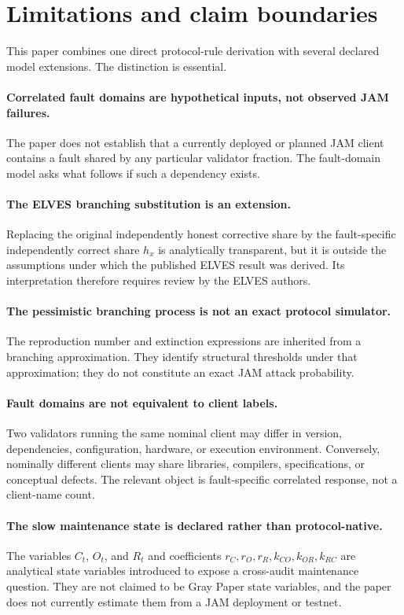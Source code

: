 \section{Limitations and claim boundaries}

This paper combines one direct protocol-rule derivation with several declared model extensions. The distinction is essential.

\paragraph{Correlated fault domains are hypothetical inputs, not observed JAM failures.}
The paper does not establish that a currently deployed or planned JAM client contains a fault shared by any particular validator fraction. The fault-domain model asks what follows if such a dependency exists.

\paragraph{The ELVES branching substitution is an extension.}
Replacing the original independently honest corrective share by the fault-specific independently correct share $h_x$ is analytically transparent, but it is outside the assumptions under which the published ELVES result was derived. Its interpretation therefore requires review by the ELVES authors.

\paragraph{The pessimistic branching process is not an exact protocol simulator.}
The reproduction number and extinction expressions are inherited from a branching approximation. They identify structural thresholds under that approximation; they do not constitute an exact JAM attack probability.

\paragraph{Fault domains are not equivalent to client labels.}
Two validators running the same nominal client may differ in version, dependencies, configuration, hardware, or execution environment. Conversely, nominally different clients may share libraries, compilers, specifications, or conceptual defects. The relevant object is fault-specific correlated response, not a client-name count.

\paragraph{The slow maintenance state is declared rather than protocol-native.}
The variables $C_t$, $O_t$, and $R_t$ and coefficients $r_C,r_O,r_R,k_{CO},k_{OR},k_{RC}$ are analytical state variables introduced to expose a cross-audit maintenance question. They are not claimed to be Gray Paper state variables, and the paper does not currently estimate them from a JAM deployment or testnet.

